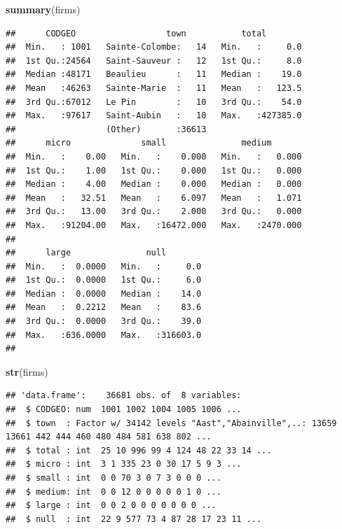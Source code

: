 \documentclass[]{article}
\newenvironment{Shaded}{\begin{snugshade}}{\end{snugshade}}
\newcommand{\KeywordTok}[1]{\textcolor[rgb]{0.13,0.29,0.53}{\textbf{#1}}}
\newcommand{\NormalTok}[1]{#1}
\begin{document}
\begin{Shaded}
\begin{Highlighting}[]
\KeywordTok{summary}\NormalTok{(firms)}
\end{Highlighting}
\end{Shaded}

\begin{verbatim}
##      CODGEO                  town           total         
##  Min.   : 1001   Sainte-Colombe:   14   Min.   :     0.0  
##  1st Qu.:24564   Saint-Sauveur :   12   1st Qu.:     8.0  
##  Median :48171   Beaulieu      :   11   Median :    19.0  
##  Mean   :46263   Sainte-Marie  :   11   Mean   :   123.5  
##  3rd Qu.:67012   Le Pin        :   10   3rd Qu.:    54.0  
##  Max.   :97617   Saint-Aubin   :   10   Max.   :427385.0  
##                  (Other)       :36613                     
##      micro              small               medium        
##  Min.   :    0.00   Min.   :    0.000   Min.   :   0.000  
##  1st Qu.:    1.00   1st Qu.:    0.000   1st Qu.:   0.000  
##  Median :    4.00   Median :    0.000   Median :   0.000  
##  Mean   :   32.51   Mean   :    6.097   Mean   :   1.071  
##  3rd Qu.:   13.00   3rd Qu.:    2.000   3rd Qu.:   0.000  
##  Max.   :91204.00   Max.   :16472.000   Max.   :2470.000  
##                                                           
##      large               null         
##  Min.   :  0.0000   Min.   :     0.0  
##  1st Qu.:  0.0000   1st Qu.:     6.0  
##  Median :  0.0000   Median :    14.0  
##  Mean   :  0.2212   Mean   :    83.6  
##  3rd Qu.:  0.0000   3rd Qu.:    39.0  
##  Max.   :636.0000   Max.   :316603.0  
## 
\end{verbatim}

\begin{Shaded}
\begin{Highlighting}[]
\KeywordTok{str}\NormalTok{(firms)}
\end{Highlighting}
\end{Shaded}

\begin{verbatim}
## 'data.frame':    36681 obs. of  8 variables:
##  $ CODGEO: num  1001 1002 1004 1005 1006 ...
##  $ town  : Factor w/ 34142 levels "Aast","Abainville",..: 13659 13661 442 444 460 480 484 581 638 802 ...
##  $ total : int  25 10 996 99 4 124 48 22 33 14 ...
##  $ micro : int  3 1 335 23 0 30 17 5 9 3 ...
##  $ small : int  0 0 70 3 0 7 3 0 0 0 ...
##  $ medium: int  0 0 12 0 0 0 0 0 1 0 ...
##  $ large : int  0 0 2 0 0 0 0 0 0 0 ...
##  $ null  : int  22 9 577 73 4 87 28 17 23 11 ...
\end{verbatim}
\end{document}
